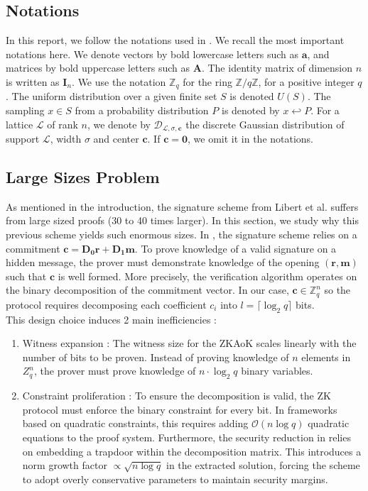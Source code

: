 \documentclass[a4paper]{article}
\begin{document}
\subsection{Notations}
In this report, we follow the notations used in \cite{mainPaper}. We recall the most important notations here. We denote vectors by bold lowercase letters such as $\mathbf{a}$, 
and matrices by bold uppercase letters such as $\mathbf{A}$. The identity matrix of dimension $n$ is written as $\mathbf{I}_n$. We use the notation $\mathbb{Z}_q$ for the ring $\mathbb{Z}/q\mathbb{Z}$, for a positive integer $q$. 
The uniform distribution over a given finite set $S$ is denoted $U(S)$. The sampling $x \in S$ from a probability distribution $P$ is denoted by $x \hookleftarrow P$. 
For a lattice $\mathcal{L}$ of rank $n$, we denote by $\mathcal{D}_{\mathcal{L}, \sigma, \mathbf{c}}$ the discrete Gaussian distribution of support $\mathcal{L}$, width $\sigma$ and center $\mathbf{c}$. 
If $\mathbf{c} = \mathbf{0}$, we omit it in the notations. 
\subsection{Large Sizes Problem}
As mentioned in the introduction, the signature scheme from Libert et al. \cite{LLM+16} suffers from large sized proofs (30 to 40 times larger). In this section, we study why
this previous scheme yields such enormous sizes. In \cite{LLM+16}, the signature scheme relies on a commitment $\mathbf{c} = \mathbf{D_0 r} + \mathbf{D_1 m}$. To
prove knowledge of a valid signature on a hidden message, the prover must demonstrate knowledge of the opening $(\mathbf{r}, \mathbf{m})$ such that $\mathbf{c}$ is well formed.
More precisely, the verification algorithm operates on the binary decomposition of the commitment vector. In our case, $\mathbf{c} \in \mathbb{Z}_q^n$ so the
protocol requires decomposing each coefficient $c_i$ into $l = \lceil \log_2 q\rceil$ bits. \\
This design choice induces 2 main inefficiencies :
\begin{enumerate}
    \item Witness expansion : The witness size for the ZKAoK scales linearly with the number of bits to be proven. Instead of proving knowledge of $n$ elements
          in $Z_q^n$, the prover must prove knowledge of $n \cdot \log_2 q$ binary variables.
    \item Constraint proliferation : To ensure the decomposition is valid, the ZK protocol must enforce the binary constraint for every bit. In frameworks
          based on quadratic constraints, this requires adding $\mathcal{O}(n \log q)$ quadratic equations to the proof system. Furthermore, the security
          reduction in \cite{LLM+16} relies on embedding a trapdoor within the decomposition matrix. This introduces a norm growth factor $\propto \sqrt{n\log q}$
          in the extracted solution, forcing the scheme to adopt overly conservative parameters to maintain security margins.
\end{enumerate}
\end{document}
